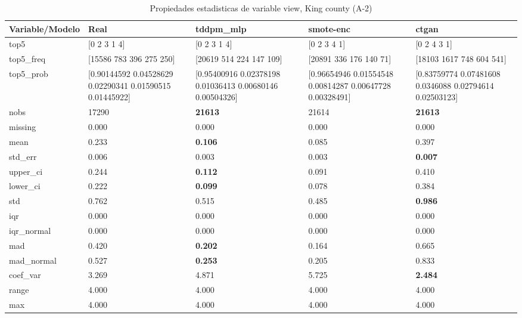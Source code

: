 \begin{table}[H]
\centering
\fontsize{8}{14}\selectfont
\caption{Propiedades  estadisticas de variable view, King county (A-2)}
\label{table-stats-king county-a-2-view}
\begin{tabular}{|l|m{10em}|m{10em}|m{10em}|m{10em}|}
\hline
 \rowcolor[gray]{0.8}
Variable/Modelo & Real & tddpm\_mlp & smote-enc & ctgan \\
\hline top5 & [0 2 3 1 4] & [0 2 3 1 4] & [0 2 3 4 1] & [0 2 4 3 1] \\
\hline top5\_freq & [15586   783   396   275   250] & [20619   514   224   147   109] & [20891   336   176   140    71] & [18103  1617   748   604   541] \\
\hline top5\_prob & [0.90144592 0.04528629 0.02290341 0.01590515 0.01445922] & [0.95400916 0.02378198 0.01036413 0.00680146 0.00504326] & [0.96654946 0.01554548 0.00814287 0.00647728 0.00328491] & [0.83759774 0.07481608 0.0346088  0.02794614 0.02503123] \\
\hline nobs & 17290 & \bfseries 21613 & \cellcolor[rgb]{0.9, 0.54, 0.52} 21614 & \bfseries 21613 \\
\hline missing & 0.000 & 0.000 & 0.000 & 0.000 \\
\hline mean & 0.233 & \bfseries 0.106 & 0.085 & \cellcolor[rgb]{0.9, 0.54, 0.52} 0.397 \\
\hline std\_err & 0.006 & 0.003 & \cellcolor[rgb]{0.9, 0.54, 0.52} 0.003 & \bfseries 0.007 \\
\hline upper\_ci & 0.244 & \bfseries 0.112 & 0.091 & \cellcolor[rgb]{0.9, 0.54, 0.52} 0.410 \\
\hline lower\_ci & 0.222 & \bfseries 0.099 & 0.078 & \cellcolor[rgb]{0.9, 0.54, 0.52} 0.384 \\
\hline std & 0.762 & 0.515 & \cellcolor[rgb]{0.9, 0.54, 0.52} 0.485 & \bfseries 0.986 \\
\hline iqr & 0.000 & 0.000 & 0.000 & 0.000 \\
\hline iqr\_normal & 0.000 & 0.000 & 0.000 & 0.000 \\
\hline mad & 0.420 & \bfseries 0.202 & \cellcolor[rgb]{0.9, 0.54, 0.52} 0.164 & 0.665 \\
\hline mad\_normal & 0.527 & \bfseries 0.253 & \cellcolor[rgb]{0.9, 0.54, 0.52} 0.205 & 0.833 \\
\hline coef\_var & 3.269 & 4.871 & \cellcolor[rgb]{0.9, 0.54, 0.52} 5.725 & \bfseries 2.484 \\
\hline range & 4.000 & 4.000 & 4.000 & 4.000 \\
\hline max & 4.000 & 4.000 & 4.000 & 4.000 \\

\end{tabular}
\end{table}
